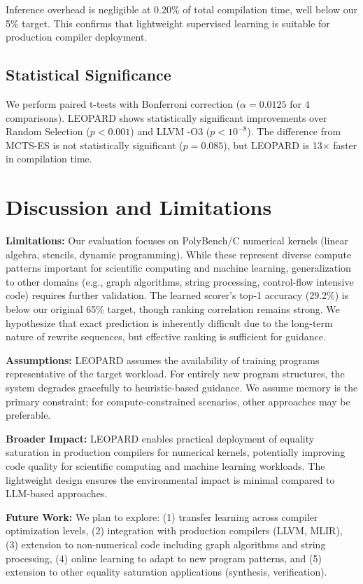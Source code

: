 \documentclass{article}
\begin{document}
Inference overhead is negligible at 0.20\% of total compilation time, well below our 5\% target. This confirms that lightweight supervised learning is suitable for production compiler deployment.

\subsection{Statistical Significance}

We perform paired t-tests with Bonferroni correction ($\alpha = 0.0125$ for 4 comparisons). LEOPARD shows statistically significant improvements over Random Selection ($p < 0.001$) and LLVM -O3 ($p < 10^{-8}$). The difference from MCTS-ES is not statistically significant ($p = 0.085$), but LEOPARD is 13$\times$ faster in compilation time.

\section{Discussion and Limitations}
\label{sec:discussion}

\textbf{Limitations:} Our evaluation focuses on PolyBench/C numerical kernels (linear algebra, stencils, dynamic programming). While these represent diverse compute patterns important for scientific computing and machine learning, generalization to other domains (e.g., graph algorithms, string processing, control-flow intensive code) requires further validation. The learned scorer's top-1 accuracy (29.2\%) is below our original 65\% target, though ranking correlation remains strong. We hypothesize that exact prediction is inherently difficult due to the long-term nature of rewrite sequences, but effective ranking is sufficient for guidance.

\textbf{Assumptions:} LEOPARD assumes the availability of training programs representative of the target workload. For entirely new program structures, the system degrades gracefully to heuristic-based guidance. We assume memory is the primary constraint; for compute-constrained scenarios, other approaches may be preferable.

\textbf{Broader Impact:} LEOPARD enables practical deployment of equality saturation in production compilers for numerical kernels, potentially improving code quality for scientific computing and machine learning workloads. The lightweight design ensures the environmental impact is minimal compared to LLM-based approaches.

\textbf{Future Work:} We plan to explore: (1) transfer learning across compiler optimization levels, (2) integration with production compilers (LLVM, MLIR), (3) extension to non-numerical code including graph algorithms and string processing, (4) online learning to adapt to new program patterns, and (5) extension to other equality saturation applications (synthesis, verification).
\end{document}
